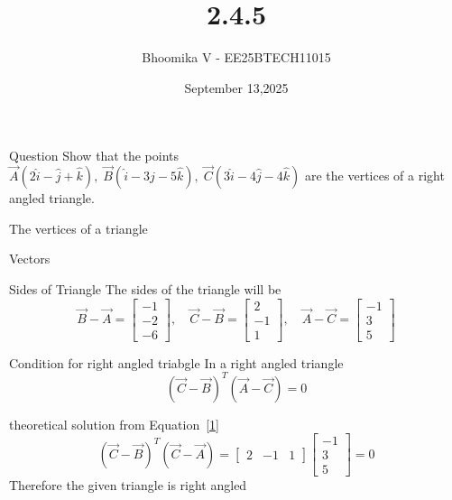 \documentclass{beamer}
\begin{document}
\title 
{2.4.5}
\date{September 13,2025}


\author 
{Bhoomika V - EE25BTECH11015}




\frame{\titlepage}
\begin{frame}{Question}
Show that the points 
$\vec{A}(2\hat{i} - \hat{j} + \hat{k}),\;
\vec{B}(\hat{i} - 3\hat{j} - 5\hat{k}),\;
\vec{C}(3\hat{i} - 4\hat{j} - 4\hat{k})$
are the vertices of a right angled triangle.
\end{frame}

\begin{frame}{The vertices of a triangle}
\begin{table}[H]    
  \centering
  
  \caption{Vectors}
  \label{Answers}
\end{table}
\end{frame}

\begin{frame}{Sides of Triangle}
The sides of the triangle will be 
\begin{equation}
\vec{B}-\vec{A} = 
\begin{bmatrix}
-1 \\ 
-2 \\ 
-6
\end{bmatrix}, \quad
\vec{C}-\vec{B} = 
\begin{bmatrix}
2 \\ 
-1 \\ 
1
\end{bmatrix}, \quad
\vec{A}-\vec{C} = 
\begin{bmatrix}
-1 \\ 
3 \\ 
5
\end{bmatrix}
\label{1}
\end{equation}
\end{frame}

\begin{frame}{Condition for right angled triabgle}
In a right angled triangle 
\begin{equation}
(\vec{C}-\vec{B})^{T} (\vec{A}-\vec{C}) = 0
\label{2}
\end{equation}
\end{frame}

\begin{frame}{theoretical solution }
from Equation~\eqref{1}
\begin{equation}
(\vec{C}-\vec{B})^{T} (\vec{C}-\vec{A}) = \begin{bmatrix}
2 &-1  & 1
\end{bmatrix}\begin{bmatrix}
-1 \\ 
3 \\ 
5
\end{bmatrix}=0
\end{equation}
Therefore the given triangle is right angled
\end{frame}
\end{document}
